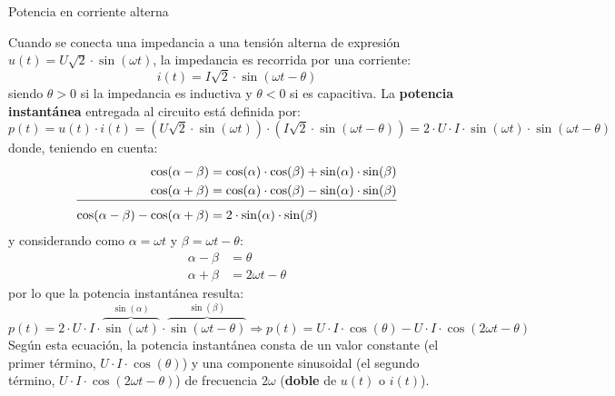 \documentclass[11pt]{book} %
\makeatletter
\numberwithin{dummy}{section}
\theoremstyle{ocrenumbox}
\theoremstyle{blacknumex}
\theoremstyle{blacknumbox}
\theoremstyle{ocrenum}
\renewcommand{\section}{\@startsection{section}{1}{\z@}
{-4ex \@plus -1ex \@minus -.4ex}
{1ex \@plus.2ex }
{\normalfont\large\sffamily\bfseries}}
\makeatother
\begin{document}
	\section{Potencia en corriente alterna}\label{sec.potencia_CA}
	
	Cuando se conecta una impedancia a una tensión alterna de expresión $u(t) = U\sqrt{2} \cdot\sin (\omega t)$, la impedancia es recorrida por una corriente:
	\begin{equation*}
		i(t) = I\sqrt{2} \cdot \sin (\omega t -\theta)
	\end{equation*}
	siendo $\theta>0$ si la impedancia es inductiva y $\theta<0$ si es capacitiva. La \textbf{potencia instantánea} entregada al circuito está definida por:
	\begin{equation*}
		p(t)=u(t)\cdot i(t)=\left(U\sqrt{2}\cdot \sin (\omega t) \right)\cdot \left(I\sqrt{2} \cdot \sin (\omega t -\theta)\right)=2\cdot U\cdot I\cdot \sin(\omega t)\cdot\sin(\omega t-\theta)
	\end{equation*}
	donde, teniendo en cuenta:
	\begin{align*}
		\cos(\alpha-\beta)&=\cos(\alpha)\cdot\cos(\beta)+\sin(\alpha)\cdot\sin(\beta)\\
		\cos(\alpha+\beta)&=\cos(\alpha)\cdot\cos(\beta)-\sin(\alpha)\cdot\sin(\beta)\\[-10pt]
		\cline{1-2}
		\cos(\alpha-\beta)-\cos(\alpha+\beta)&=2\cdot\sin(\alpha)\cdot\sin(\beta)%
	\end{align*}
	y considerando como $\alpha=\omega t$ y $\beta=\omega t-\theta$:
	\begin{align*}
		\alpha-\beta&=\theta\\
		\alpha +\beta&=2\omega t-\theta
	\end{align*}
	por lo que la potencia instantánea resulta:
	\begin{equation}\label{eq.pot_inst}
		p(t)=2\cdot U\cdot I\cdot \overbrace{\sin(\omega t)}^{\sin(\alpha)}\cdot\overbrace{\sin(\omega t-\theta)}^{\sin(\beta)}\Rightarrow \boxed{p(t)
			=U\cdot I \cdot \cos(\theta)-U\cdot I \cdot\cos(2\omega t-\theta)}
	\end{equation}
	Según esta ecuación, la potencia instantánea consta de un {valor constante} (el primer término, $U\cdot I\cdot \cos(\theta)$) y una componente sinusoidal (el segundo término, $U\cdot I\cdot \cos(2 \omega t-\theta)$) de frecuencia $2\omega$ (\textbf{doble} de $u(t)$ o $i(t)$). 
	
\end{document}
